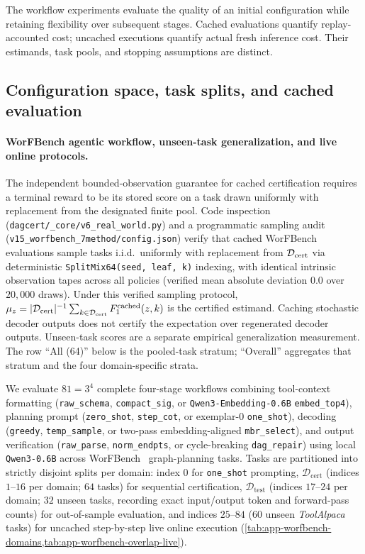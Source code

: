 \documentclass{article}
\theoremstyle{plain}
\theoremstyle{definition}
\begin{document}
The workflow experiments evaluate the quality of an initial configuration while retaining flexibility over subsequent stages. Cached evaluations quantify replay-accounted cost; uncached executions quantify actual fresh inference cost. Their estimands, task pools, and stopping assumptions are distinct.

\subsection{Configuration space, task splits, and cached evaluation}

\paragraph{WorFBench agentic workflow, unseen-task generalization, and live online protocols.}
The independent bounded-observation guarantee for cached certification
requires a terminal reward to be its stored score on a task drawn uniformly
with replacement from the designated finite pool. Code inspection
(\texttt{dagcert/\_core/v6\_real\_world.py}) and a programmatic sampling
audit (\texttt{v15\_worfbench\_7method/config.json}) verify that cached
WorFBench evaluations sample tasks i.i.d.\ uniformly with replacement from
$\mathcal D_{\rm cert}$ via deterministic \texttt{SplitMix64(seed, leaf, k)}
indexing, with identical intrinsic observation tapes across all policies
(verified mean absolute deviation $0.0$ over $20{,}000$ draws). Under this
verified sampling protocol,
$\mu_z=|\mathcal D_{\rm cert}|^{-1}\sum_{k\in\mathcal D_{\rm cert}}
F^{\rm cached}_1(z,k)$ is the certified estimand. Caching stochastic decoder
outputs does not certify the expectation over regenerated decoder outputs.
Unseen-task scores are a separate empirical generalization measurement.
The row ``All (64)'' below is the pooled-task stratum; ``Overall'' aggregates
that stratum and the four domain-specific strata.

We evaluate $81=3^4$ complete four-stage workflows combining tool-context formatting (\texttt{raw\_schema}, \texttt{compact\_sig}, or \texttt{Qwen3-Embedding-0.6B} \texttt{embed\_top4}), planning prompt (\texttt{zero\_shot}, \texttt{step\_cot}, or exemplar-$0$ \texttt{one\_shot}), decoding (\texttt{greedy}, \texttt{temp\_sample}, or two-pass embedding-aligned \texttt{mbr\_select}), and output verification (\texttt{raw\_parse}, \texttt{norm\_endpts}, or cycle-breaking \texttt{dag\_repair}) using local \texttt{Qwen3-0.6B} across WorFBench~\citep{qiao2025worfbench} graph-planning tasks. Tasks are partitioned into strictly disjoint splits per domain: index $0$ for \texttt{one\_shot} prompting, $\mathcal D_{\mathrm{cert}}$ (indices $1\text{--}16$ per domain; $64$ tasks) for sequential certification, $\mathcal D_{\mathrm{test}}$ (indices $17\text{--}24$ per domain; $32$ unseen tasks, recording exact input/output token and forward-pass counts) for out-of-sample evaluation, and indices $25\text{--}84$ ($60$ unseen \emph{ToolAlpaca} tasks) for uncached step-by-step live online execution (\cref{tab:app-worfbench-domains,tab:app-worfbench-overlap-live}).
\end{document}
